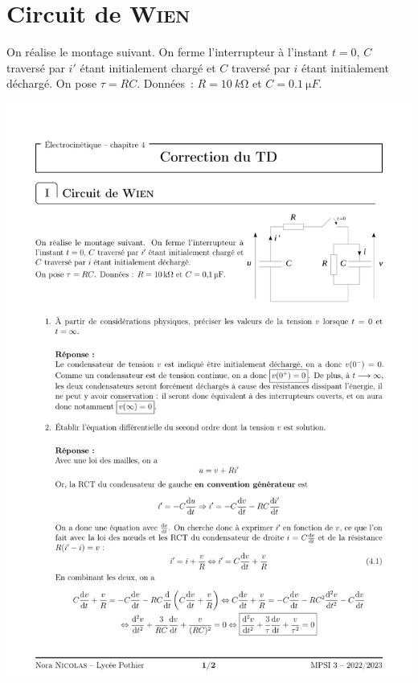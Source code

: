 \documentclass[a4paper, 12pt, final, garamond]{book}
\begin{document}
\resetQ
\section{Circuit de \textsc{Wien}}

\begin{minipage}{0.60\linewidth}

    On réalise le montage suivant. On ferme l'interrupteur à l'instant $t =0$,
    $C$ traversé par $i'$ étant initialement chargé et $C$ traversé par $i$
    étant initialement déchargé.\smallbreak
    On pose $\tau = RC$. Données~: $R = \SI{10}{k\ohm}$ et $C = \SI{0.1}{\micro
    F}$.
\end{minipage}
\begin{minipage}{0.40\linewidth}
    \centering
    \includegraphics[width=\linewidth]{wien}
\end{minipage}
\end{document}
